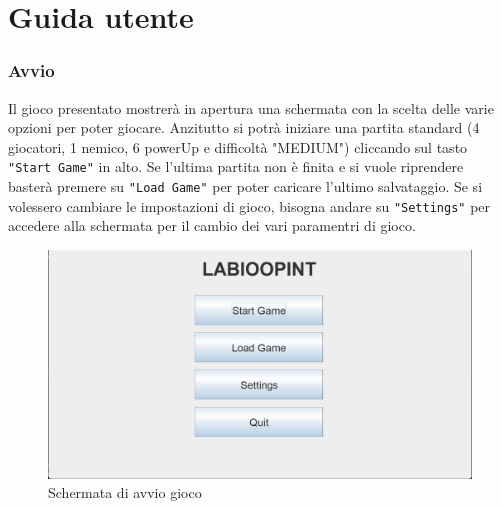 \documentclass[a4paper,12pt]{report}
\begin{document}
\chapter{Guida utente}

\subsection*{Avvio}
Il gioco presentato mostrerà in apertura una schermata con la scelta delle varie opzioni per poter giocare. Anzitutto si potrà iniziare 
una partita standard (4 giocatori, 1 nemico, 6 powerUp e difficoltà "MEDIUM") cliccando sul tasto \texttt{"Start Game"} in alto. Se l'ultima partita non è finita e si vuole riprendere basterà premere su 
\texttt{"Load Game"} per poter caricare l'ultimo salvataggio. Se si volessero cambiare le impostazioni di gioco, bisogna andare su \texttt{"Settings"} per accedere alla 
schermata per il cambio dei vari paramentri di gioco. 
\begin{figure}
	\centering
	\includegraphics[width=\textwidth]{img/HomePage.png}
	\caption{Schermata di avvio gioco}
	\label{img:HomePage}
\end{figure}
\end{document}
